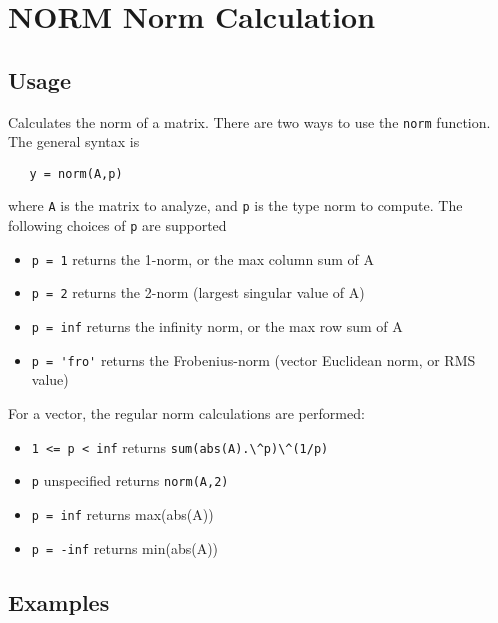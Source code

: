 \section{NORM Norm Calculation}

\subsection{Usage}

Calculates the norm of a matrix.  There are two ways to
use the \verb|norm| function.  The general syntax is
\begin{verbatim}
   y = norm(A,p)
\end{verbatim}
where \verb|A| is the matrix to analyze, and \verb|p| is the
type norm to compute.  The following choices of \verb|p|
are supported
\begin{itemize}
\item  \verb|p = 1| returns the 1-norm, or the max column sum of A

\item  \verb|p = 2| returns the 2-norm (largest singular value of A)

\item  \verb|p = inf| returns the infinity norm, or the max row sum of A

\item  \verb|p = 'fro'| returns the Frobenius-norm (vector Euclidean norm, or RMS value)

\end{itemize}
For a vector, the regular norm calculations are performed:
\begin{itemize}
\item  \verb|1 <= p < inf| returns \verb|sum(abs(A).\^p)\^(1/p)|

\item  \verb|p| unspecified returns \verb|norm(A,2)|

\item  \verb|p = inf| returns max(abs(A))

\item  \verb|p = -inf| returns min(abs(A))

\end{itemize}
\subsection{Examples}

